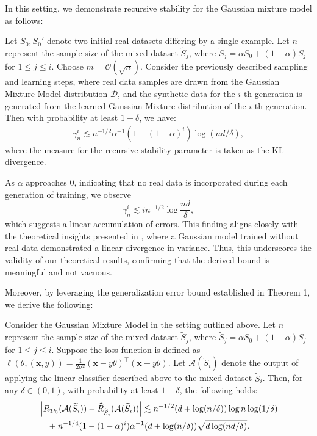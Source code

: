 In this setting, we demonstrate recursive stability for the Gaussian mixture model as follows:

\begin{theorem}
Let \(S_0, S_0'\) denote two initial real datasets differing by a single example. Let \(n\) represent the sample size of the mixed dataset \(\tilde{S}_j\), where \(\tilde{S}_j = \alpha S_0 + (1 - \alpha) S_j\) for \(1 \leq j \leq i\). Choose \(m = \mathcal{O}(\sqrt{n})\). Consider the previously described sampling and learning steps, where real data samples are drawn from the Gaussian Mixture Model distribution \(\mathcal{D}\), and the synthetic data for the \(i\)-th generation is generated from the learned Gaussian Mixture distribution of the \(i\)-th generation. Then with probability at least \(1-\delta\), we have:
\begin{align}
    \gamma_n^i \lesssim n^{-1/2} \alpha^{-1}(1-(1-\alpha)^i)\log (nd/\delta),
\end{align}
where the measure for the recursive stability parameter is taken as the KL divergence.
\end{theorem}

As \(\alpha\) approaches 0, indicating that no real data is incorporated during each generation of training, we observe  
\[
\gamma_n^i \lesssim i n^{-1/2} \log \frac{nd}{\delta},
\]
which suggests a linear accumulation of errors. This finding aligns closely with the theoretical insights presented in \cite{shumailov2024ai,alemohammadself}, where a Gaussian model trained without real data demonstrated a linear divergence in variance. Thus, this underscores the validity of our theoretical results, confirming that the derived bound is meaningful and not vacuous.

Moreover, by leveraging the generalization error bound established in Theorem 1, we derive the following:

\begin{theorem}
 Consider the Gaussian Mixture Model in the setting outlined above. Let \(n\) represent the sample size of the mixed dataset \(\tilde{S}_j\), where \(\tilde{S}_j = \alpha S_0 + (1 - \alpha) S_j\) for \(1 \leq j \leq i\). Suppose the loss function is defined as \(\ell(\theta, (\mathbf{x}, y)) = \frac{1}{2\sigma^2} (\mathbf{x} - y\theta)^\top (\mathbf{x} - y\theta)\). Let \(\mathcal{A}(\tilde{S}_i)\) denote the output of applying the linear classifier described above to the mixed dataset \(\tilde{S}_i\). Then, for any \(\delta \in (0,1)\), with probability at least \(1-\delta\), the following holds:
\begin{align}
    &\left|R_{\mathcal{D}_0}(\mathcal{A}(\widetilde{S}_i))-\widehat{R}_{\widetilde{S}_i}(\mathcal{A}(\widetilde{S}_i))\right|\lesssim n^{-1/2}(d+\log(n/\delta))\log n\log (1/\delta) \notag \\
    &\quad+n^{-1/4}(1-(1-\alpha)^i)\alpha^{-1}(d+\log (n/\delta))\sqrt{d\log(nd/\delta)}.
\end{align}
\end{theorem}

